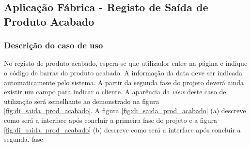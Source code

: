 \subsection{Aplicação Fábrica - Registo de Saída de Produto Acabado}
\subsubsection*{Descrição do caso de uso}
No registo de produto acabado, espera-se que utilizador entre na página e indique o código de barras do produto acabado. A informação da data deve ser indicada automaticamente pelo sistema. A partir da segunda fase do projeto deverá ainda existir um campo para indicar o cliente. A aparência da \textit{view} deste caso de utilização será semelhante ao demonstrado na figura \ref{fig:di_saida_prod_acabado}. A figura  \ref{fig:di_saida_prod_acabado} (a) descreve como será a interface após concluir a primeira fase do projeto e a figura  \ref{fig:di_saida_prod_acabado} (b) descreve como será a interface após concluir a segunda. fase

